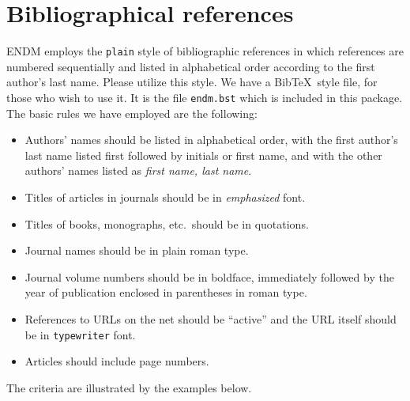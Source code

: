 \documentclass{endm}
\begin{document}
\section{Bibliographical references}\label{references}

ENDM employs the \texttt{plain} style of bibliographic references in
which references are numbered sequentially and listed in alphabetical
order according to the first author's last name. Please utilize this
style. We have a Bib\TeX\ style file, for those who wish to use it.
It is the file \texttt{endm.bst} which is included in this package.
The basic rules we have employed are the following:
\begin{itemize}
\item Authors' names should be listed in alphabetical order, with the
first author's last name listed first followed by initials or first
name, and with the other authors' names listed as \emph{first name,
last name}.
\item Titles of articles in journals should be in \emph{emphasized}
font.
\item Titles of books, monographs, etc.\ should be in quotations.
\item Journal names should be in plain roman type.
\item Journal volume numbers should be in boldface, immediately
followed by the year of publication enclosed in parentheses in
roman type.
\item References to URLs on the net should be ``active'' and the URL
itself should be in {\tt typewriter} font.
\item Articles should include page numbers.
\end{itemize}

The criteria are illustrated by the examples below.



\end{document}
